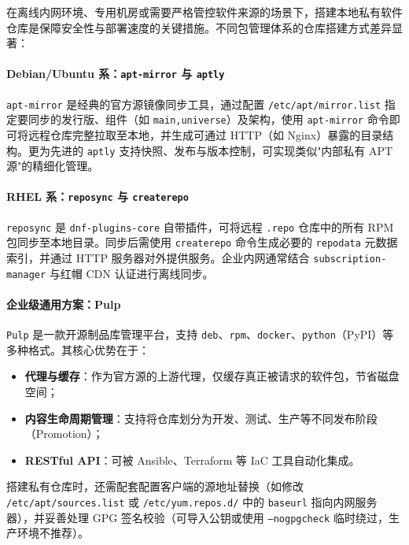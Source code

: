\documentclass[12pt,UTF8]{ctexbook}
\begin{document}
在离线内网环境、专用机房或需要严格管控软件来源的场景下，搭建本地私有软件仓库是保障安全性与部署速度的关键措施。不同包管理体系的仓库搭建方式差异显著：

\paragraph{Debian/Ubuntu 系：\texttt{apt-mirror} 与 \texttt{aptly}}

\texttt{apt-mirror} 是经典的官方源镜像同步工具，通过配置 \texttt{/etc/apt/mirror.list} 指定要同步的发行版、组件（如 \texttt{main,universe}）及架构，使用 \verb|apt-mirror| 命令即可将远程仓库完整拉取至本地，并生成可通过 HTTP（如 Nginx）暴露的目录结构。更为先进的 \texttt{aptly} 支持快照、发布与版本控制，可实现类似"内部私有 APT 源"的精细化管理。

\paragraph{RHEL 系：\texttt{reposync} 与 \texttt{createrepo}}

\texttt{reposync} 是 \texttt{dnf-plugins-core} 自带插件，可将远程 \texttt{.repo} 仓库中的所有 RPM 包同步至本地目录。同步后需使用 \texttt{createrepo} 命令生成必要的 \texttt{repodata} 元数据索引，并通过 HTTP 服务器对外提供服务。企业内网通常结合 \texttt{subscription-manager} 与红帽 CDN 认证进行离线同步。

\paragraph{企业级通用方案：Pulp}

\texttt{Pulp} 是一款开源制品库管理平台，支持 \texttt{deb}、\texttt{rpm}、\texttt{docker}、\texttt{python}（PyPI）等多种格式。其核心优势在于：
\begin{itemize}
	\item \textbf{代理与缓存}：作为官方源的上游代理，仅缓存真正被请求的软件包，节省磁盘空间；
	\item \textbf{内容生命周期管理}：支持将仓库划分为开发、测试、生产等不同发布阶段（Promotion）；
	\item \textbf{RESTful API}：可被 Ansible、Terraform 等 IaC 工具自动化集成。
\end{itemize}

搭建私有仓库时，还需配套配置客户端的源地址替换（如修改 \texttt{/etc/apt/sources.list} 或 \texttt{/etc/yum.repos.d/} 中的 \texttt{baseurl} 指向内网服务器），并妥善处理 GPG 签名校验（可导入公钥或使用 \texttt{--nogpgcheck} 临时绕过，生产环境不推荐）。
\end{document}
